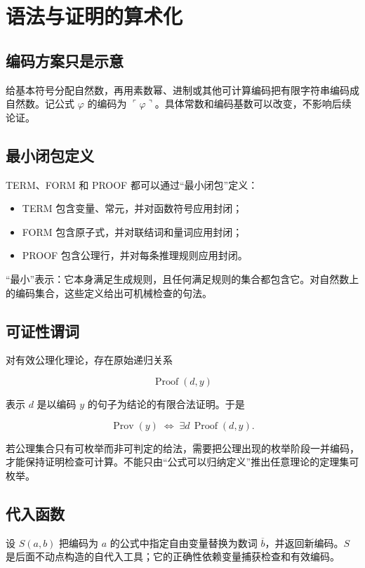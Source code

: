\section{语法与证明的算术化}


\subsection{编码方案只是示意}


给基本符号分配自然数，再用素数幂、进制或其他可计算编码把有限字符串编码成自然数。记公式 $\varphi$ 的编码为 $\ulcorner\varphi\urcorner$。具体常数和编码基数可以改变，不影响后续论证。

\subsection{最小闭包定义}


TERM、FORM 和 PROOF 都可以通过“最小闭包”定义：

\begin{itemize}
\item TERM 包含变量、常元，并对函数符号应用封闭；
\item FORM 包含原子式，并对联结词和量词应用封闭；
\item PROOF 包含公理行，并对每条推理规则应用封闭。
\end{itemize}


“最小”表示：它本身满足生成规则，且任何满足规则的集合都包含它。对自然数上的编码集合，这些定义给出可机械检查的句法。

\subsection{可证性谓词}


对有效公理化理论，存在原始递归关系

\[
\operatorname{Proof}(d,y)
\]

表示 $d$ 是以编码 $y$ 的句子为结论的有限合法证明。于是

\[
\operatorname{Prov}(y)\;\Longleftrightarrow\;\exists d\,\operatorname{Proof}(d,y).
\]

若公理集合只有可枚举而非可判定的给法，需要把公理出现的枚举阶段一并编码，才能保持证明检查可计算。不能只由“公式可以归纳定义”推出任意理论的定理集可枚举。

\subsection{代入函数}


设 $S(a,b)$ 把编码为 $a$ 的公式中指定自由变量替换为数词 $\overline b$，并返回新编码。$S$ 是后面不动点构造的自代入工具；它的正确性依赖变量捕获检查和有效编码。
